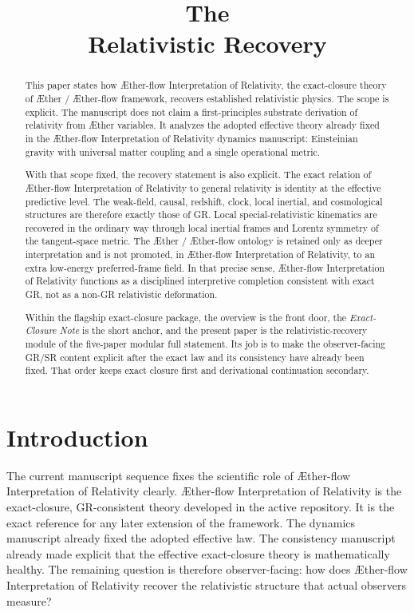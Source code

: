 \documentclass[11pt]{article}
\title{\textbf{The \TheoryName{}}\\[0.4em]
\large Relativistic Recovery}
\author{}
\date{}
\newcommand{\Aether}{\AE{}ther}
\newcommand{\Aflow}{\AE{}ther-flow}
\newcommand{\TheoryName}{\Aflow{} Interpretation of Relativity}
\newcommand{\TheoryProgram}{\Aether{} / \Aflow{} framework}
\begin{document}
\AetherFlowAPATitlePage

\begin{abstract}
This paper states how \TheoryName{}, the exact-closure theory of \TheoryProgram{}, recovers established relativistic physics. The scope is explicit. The manuscript does not claim a first-principles substrate derivation of relativity from \Aether{} variables. It analyzes the adopted effective theory already fixed in the \TheoryName{} dynamics manuscript: Einsteinian gravity with universal matter coupling and a single operational metric.

With that scope fixed, the recovery statement is also explicit. The exact relation of \TheoryName{} to general relativity is identity at the effective predictive level. The weak-field, causal, redshift, clock, local inertial, and cosmological structures are therefore exactly those of GR. Local special-relativistic kinematics are recovered in the ordinary way through local inertial frames and Lorentz symmetry of the tangent-space metric. The \Aether{} / \Aflow{} ontology is retained only as deeper interpretation and is not promoted, in \TheoryName{}, to an extra low-energy preferred-frame field. In that precise sense, \TheoryName{} functions as a disciplined interpretive completion consistent with exact GR, not as a non-GR relativistic deformation.

Within the flagship exact-closure package, the overview is the front door, the \emph{Exact-Closure Note} is the short anchor, and the present paper is the relativistic-recovery module of the five-paper modular full statement. Its job is to make the observer-facing GR/SR content explicit after the exact law and its consistency have already been fixed. That order keeps exact closure first and derivational continuation secondary.
\end{abstract}

\section{Introduction}

The current manuscript sequence fixes the scientific role of \TheoryName{} clearly. \TheoryName{} is the exact-closure, GR-consistent theory developed in the active repository. It is the exact reference for any later extension of the framework. The dynamics manuscript already fixed the adopted effective law. The consistency manuscript already made explicit that the effective exact-closure theory is mathematically healthy. The remaining question is therefore observer-facing: how does \TheoryName{} recover the relativistic structure that actual observers measure?
\end{document}
